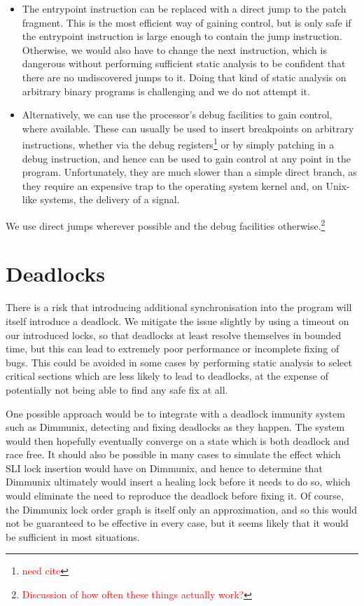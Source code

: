 \documentclass[10pt,twocolumn,preprint,natbib,authoryear]{sigplanconf}
\newcommand{\editorial}[1]{\textcolor{red}{\footnote{\textcolor{red}{#1}}}}
\newcommand{\needCite}{\editorial{need cite}}
\begin{document}
\begin{itemize}
\item The entrypoint instruction can be replaced with a direct jump to
  the patch fragment.  This is the most efficient way of gaining
  control, but is only safe if the entrypoint instruction is large
  enough to contain the jump instruction.  Otherwise, we would also
  have to change the next instruction, which is dangerous without
  performing sufficient static analysis to be confident that there are
  no undiscovered jumps to it.  Doing that kind of static analysis on
  arbitrary binary programs is challenging and we do not attempt it.

\item Alternatively, we can use the processor's debug facilities to
  gain control, where available.  These can usually be used to insert
  breakpoints on arbitrary instructions, whether via the debug
  registers\needCite{} or by simply patching in a debug instruction,
  and hence can be used to gain control at any point in the program.
  Unfortunately, they are much slower than a simple direct branch, as
  they require an expensive trap to the operating system kernel and,
  on Unix-like systems, the delivery of a signal.
\end{itemize}

We use direct jumps wherever possible and the debug facilities
otherwise.\editorial{Discussion of how often these things actually
  work?}

\section{Deadlocks}

There is a risk that introducing additional synchronisation into the
program will itself introduce a deadlock.  We mitigate the issue
slightly by using a timeout on our introduced locks, so that deadlocks
at least resolve themselves in bounded time, but this can lead to
extremely poor performance or incomplete fixing of bugs.  This could
be avoided in some cases by performing static analysis to select
critical sections which are less likely to lead to deadlocks, at the
expense of potentially not being able to find any safe fix at all.

One possible approach would be to integrate with a deadlock immunity
system such as Dimmunix\cite{Jula2008}, detecting and fixing deadlocks
as they happen.  The system would then hopefully eventually converge
on a state which is both deadlock and race free.  It should also be
possible in many cases to simulate the effect which SLI lock insertion
would have on Dimmunix, and hence to determine that Dimmunix
ultimately would insert a healing lock before it needs to do so, which
would eliminate the need to reproduce the deadlock before fixing it.
Of course, the Dimmunix lock order graph is itself only an
approximation, and so this would not be guaranteed to be effective in
every case, but it seems likely that it would be sufficient in most
situations.
\end{document}
